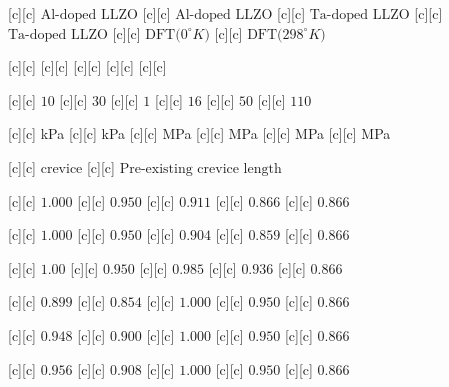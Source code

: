 [c][c] {$\text{Al-doped LLZO}$}
[c][c] {$\text{Al-doped LLZO}$}
[c][c] {$\text{Ta-doped LLZO}$}
[c][c] {$\text{Ta-doped LLZO}$}
[c][c] {$\text{DFT($0^{\circ}K$)}$}
[c][c] {$\text{DFT($298^{\circ}K$)}$}

[c][c] {}
[c][c] {}
[c][c] {}
[c][c] {}
[c][c] {}

[c][c] {\small $10$}
[c][c] {\small $30$}
[c][c] {\small $1$}
[c][c] {\small $16$}
[c][c] {\small $50$}
[c][c] {\small $110$}

[c][c] {\small kPa}
[c][c] {\small kPa}
[c][c] {\small MPa}
[c][c] {\small MPa}
[c][c] {\small MPa}
[c][c] {\small MPa}

[c][c] {$\text{crevice}$}
[c][c] {$\text{Pre-existing crevice length}$}

[c][c] {\tiny $1.000$}
[c][c] {\tiny $0.950$}
[c][c] {\tiny $0.911$}
[c][c] {\tiny $0.866$}
[c][c] {\tiny $0.866$}

[c][c] {\tiny $1.000$}
[c][c] {\tiny $0.950$}
[c][c] {\tiny $0.904$}
[c][c] {\tiny $0.859$}
[c][c] {\tiny $0.866$}

[c][c] {\tiny $1.00$}
[c][c] {\tiny $0.950$}
[c][c] {\tiny $0.985$}
[c][c] {\tiny $0.936$}
[c][c] {\tiny $0.866$}

[c][c] {\tiny $0.899$}
[c][c] {\tiny $0.854$}
[c][c] {\tiny $1.000$}
[c][c] {\tiny $0.950$}
[c][c] {\tiny $0.866$}

[c][c] {\tiny $0.948$}
[c][c] {\tiny $0.900$}
[c][c] {\tiny $1.000$}
[c][c] {\tiny $0.950$}
[c][c] {\tiny $0.866$}

[c][c] {\tiny $0.956$}
[c][c] {\tiny $0.908$}
[c][c] {\tiny $1.000$}
[c][c] {\tiny $0.950$}
[c][c] {\tiny $0.866$}


